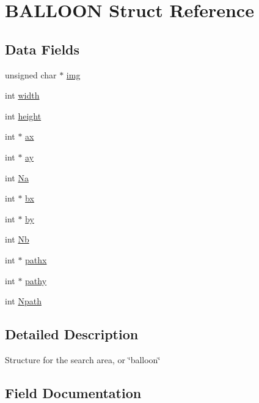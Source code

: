 \hypertarget{struct_b_a_l_l_o_o_n}{}\section{B\+A\+L\+L\+O\+ON Struct Reference}
\label{struct_b_a_l_l_o_o_n}
\subsection*{Data Fields}
\begin{DoxyCompactItemize}
\item 
unsigned char $\ast$ \hyperlink{struct_b_a_l_l_o_o_n_ac46d50ca34550afcf41745e3a6b4945d}{img}
\item 
int \hyperlink{struct_b_a_l_l_o_o_n_a3aa32ca888a9814d614a950ea0604dad}{width}
\item 
int \hyperlink{struct_b_a_l_l_o_o_n_aba3e8ab706759466cce70a6a6659db48}{height}
\item 
int $\ast$ \hyperlink{struct_b_a_l_l_o_o_n_a16c8dde029c0db3f4cd2b7e5a6f40657}{ax}
\item 
int $\ast$ \hyperlink{struct_b_a_l_l_o_o_n_a70c7eb1aef5383b175c39d798bab3542}{ay}
\item 
int \hyperlink{struct_b_a_l_l_o_o_n_a76b75cde6c3eb4c4ce4c6dd65bb02b5a}{Na}
\item 
int $\ast$ \hyperlink{struct_b_a_l_l_o_o_n_aa164004d293b763232f1cd826ee9e62b}{bx}
\item 
int $\ast$ \hyperlink{struct_b_a_l_l_o_o_n_a812399e00c07b144e6798e47fdd887c2}{by}
\item 
int \hyperlink{struct_b_a_l_l_o_o_n_a85e567fb946d66b7253609afc8881f16}{Nb}
\item 
int $\ast$ \hyperlink{struct_b_a_l_l_o_o_n_ac621abfcd3ff3f7723bdea2a27958373}{pathx}
\item 
int $\ast$ \hyperlink{struct_b_a_l_l_o_o_n_a27c1b2f655569a48a3dab4efc4d176cb}{pathy}
\item 
int \hyperlink{struct_b_a_l_l_o_o_n_ae1c9ea29b29e7aadaff70947a4d26a71}{Npath}
\end{DoxyCompactItemize}


\subsection{Detailed Description}
Structure for the search area, or \char`\"{}balloon\char`\"{} 

\subsection{Field Documentation}
